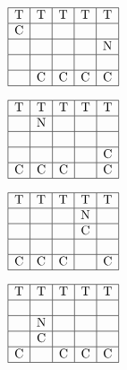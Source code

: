 \noindent
\begin{center}
	\begin{minipage}{0.2\textwidth}
		\footnotesize
		\[
		\begin{array}{|c|c|c|c|c|}
			\hline
			\text{T} & \text{T} & \text{T} & \text{T} & \text{T}\\
			\hline
			\text{C} & & & &\\
			\hline
			& & & & \text{N}\\
			\hline
			& & & &\\
			\hline
			& \text{C} & \text{C} & \text{C} & \text{C}\\
			\hline
		\end{array}
		\]
	\end{minipage}
	\hspace{0.03\textwidth}
	\begin{minipage}{0.2\textwidth}
		\footnotesize
		\[
		\begin{array}{|c|c|c|c|c|}
			\hline
			\text{T} & \text{T} & \text{T} & \text{T} & \text{T}\\
			\hline
			& \text{N} & & &\\
			\hline
			& & & &\\
			\hline
			& & & & \text{C}\\
			\hline
			\text{C} & \text{C} & \text{C} &  & \text{C}\\
			\hline
		\end{array}
		\]
	\end{minipage}
	\hspace{0.03\textwidth}
	\begin{minipage}{0.2\textwidth}
		\footnotesize
		\[
	\begin{array}{|c|c|c|c|c|}
		\hline
		\text{T} & \text{T} & \text{T} & \text{T} & \text{T}\\
		\hline
		& & & \text{N} &\\
		\hline
		& &  & \text{C} &\\
		\hline
		& & & & \\
		\hline
		\text{C} & \text{C} & \text{C} &  & \text{C} \\
		\hline
	\end{array}
	\]
	\end{minipage}
	\hspace{0.03\textwidth}
	\begin{minipage}{0.2\textwidth}
		\footnotesize
		\[
	\begin{array}{|c|c|c|c|c|}
		\hline
		\text{T} & \text{T} & \text{T} & \text{T} & \text{T}\\
		\hline
		& & & & \\
		\hline
		& \text{N} & & &\\
		\hline
		& \text{C} & & &\\
		\hline
		\text{C} & & \text{C} & \text{C} & \text{C} \\
		\hline
	\end{array}
	\]
\end{minipage}
\end{center}

